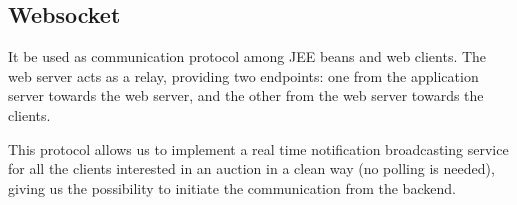 \subsection{Websocket}\label{subsec:archwebsocket}

It be used as communication protocol among JEE beans and web clients. The web
server acts as a relay, providing two endpoints: one from the application server
towards the web server, and the other from the web server towards the clients.

This protocol allows us to implement a real time notification broadcasting
service for all the clients interested in an auction in a clean way (no polling
is needed), giving us the possibility to initiate the communication from the
backend.
